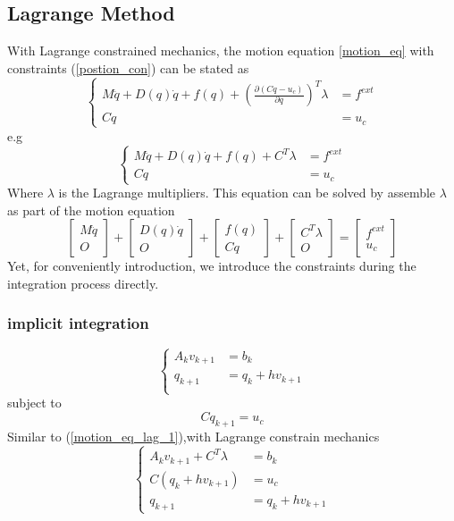 \documentclass[twocolumn]{article}
\begin{document}
\subsection{Lagrange Method}
With Lagrange constrained mechanics, the motion equation \ref{motion_eq} with
constraints (\ref{postion_con}) can be stated as 
\begin{equation} \label{motion_eq_lag_1} 
  \left\{ \begin{array}
      {rl} M\ddot{q} + D(q)\dot{q} + f(q) + (\frac{\partial{(Cq -
          u_c)}}{\partial{q}})^T\lambda &= f^{ext} \\
      Cq &= u_c
    \end{array} \right.
\end{equation}
e.g
\[
\left\{ \begin{array}{rl}
        M\ddot{q} + D(q)\dot{q} + f(q) + C^T\lambda &= f^{ext} \\
        Cq &= u_c
  \end{array} \right.\nonumber
\]
Where $\lambda$ is the Lagrange multipliers. This equation can be solved by
assemble $\lambda$ as part of the motion equation 
\[
    \left[ \begin{array}{c}
        M\ddot{q} \\
        O
      \end{array} \right] + 
    \left[ \begin{array}{c}
        D(q)\dot{q}\\
        O
      \end{array} \right] +
    \left[ \begin{array}{c}
        f(q) \\
        Cq
      \end{array} \right] + 
    \left[ \begin{array}{c}
        C^T\lambda \\
        O
      \end{array} \right] =
    \left[ \begin{array}{c}
        f^{ext}  \\
        u_c
      \end{array} \right]
\]
Yet, for conveniently introduction, we introduce the constraints during the
integration process directly. 
\subsubsection{implicit integration}
\[
\left\{ \begin{array}{rl}
    A_k v _{k+1}  &= b_k\\
    {q} _{k+1} &= q _{k} + hv _{k+1} \\
  \end{array} \right.\nonumber
\]
subject to
\[
C q_{k+1} = u_c
\]
Similar to (\ref{motion_eq_lag_1}),with Lagrange constrain mechanics
\[
\left\{ \begin{array}{rl}
    A_k v _{k+1} + C^T\lambda &= b_k\\
    C (q_{k}+ hv _{k+1}) &= u_c \\
    {q} _{k+1}  &= q _{k}  + hv _{k+1}
  \end{array} \right.\nonumber
\]
\end{document}
